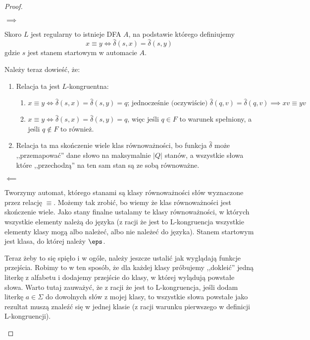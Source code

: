 \begin{proof} \( \)
    \begin{description}
        \item \( \implies \)
        
        Skoro \( L \) jest regularny to istnieje DFA \( A \), na podstawie którego definiujemy
        \[
            x \equiv y \iff \hat \delta(s, x) = \hat \delta(s, y)
        \]
        gdzie \(s\) jest stanem startowym w automacie \(A\).
        
        Należy teraz dowieść, że:
        
        \begin{enumerate}
            \item Relacja ta jest \(L\)-kongruentna: \begin{enumerate}
                \item \(x \equiv y \iff \hat \delta(s, x) = \hat \delta(s, y) = q \text{; jednocześnie (oczywiście) } \hat \delta(q, v) = \hat \delta(q, v) \implies xv \equiv yv\)
                \item \(x \equiv y \iff \hat \delta(s, x) = \hat \delta(s, y) = q \), więc jeśli \(q \in F\) to warunek spełniony, a jeśli \(q \not \in F\) to również. 
        
            \end{enumerate} 
            
            \item Relacja ta ma skończenie wiele klas równoważności, bo funkcja \( \hat \delta \) może ,,przemapować'' dane słowo na maksymalnie \( |Q| \) stanów, a wszystkie słowa które ,,przechodzą'' na ten sam stan są ze sobą równoważne. 
            
        \end{enumerate}
        
        \item \( \impliedby \)
        
        Tworzymy automat, którego stanami są klasy równoważności słów wyznaczone przez relację \( \equiv \). Możemy tak zrobić, bo wiemy że klas równoważności jest skończenie wiele. Jako stany finalne ustalamy te klasy równoważności, w których wszystkie elementy należą do języka (z racji że jest to L-kongruencja wszystkie elementy klasy mogą albo należeć, albo nie należeć do języka). Stanem startowym jest klasa, do której należy \( \eps \). 
        
        Teraz żeby to się spięło i w ogóle, należy jeszcze ustalić jak wyglądają funkcje przejścia. Robimy to w ten sposób, że dla każdej klasy próbujemy ,,dokleić'' jedną literkę z alfabetu i dodajemy przejście do klasy, w której wylądują powstałe słowa. Warto tutaj zauważyć, że z racji że jest to L-kongruencja, jeśli dodam literkę \(a \in \Sigma \) do dowolnych słów z mojej klasy, to wszystkie słowa powstałe jako rezultat muszą znaleźć się w jednej klasie (z racji warunku pierwszego w definicji L-kongruencji). 
        

\end{description}
\end{proof}
